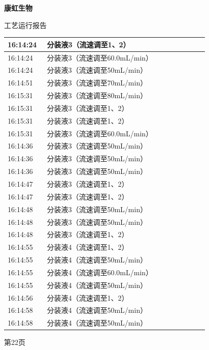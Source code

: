 \documentclass[UTF8,10pt,a4paper,fontset=fandol]{ctexart}
\begin{document}
\hfill
\begin{minipage}[t]{0.48\linewidth}
\centering
\textbf{康虹生物}

\vspace{0.2em}
工艺运行报告

\vspace{0.4em}
\scriptsize
\begin{tabular}{|p{0.18\linewidth}|p{0.74\linewidth}|}
\hline
16:14:24 & 分装液3（流速调至1、2）\\ \hline
16:14:24 & 分装液3（流速调至60.0mL/min）\\ \hline
16:14:24 & 分装液3（流速调至50mL/min）\\ \hline
16:14:51 & 分装液3（流速调至70mL/min）\\ \hline
16:15:31 & 分装液3（流速调至80mL/min）\\ \hline
16:15:31 & 分装液3（流速调至1、2）\\ \hline
16:15:31 & 分装液3（流速调至1、2）\\ \hline
16:15:31 & 分装液3（流速调至60.0mL/min）\\ \hline
16:14:36 & 分装液3（流速调至50mL/min）\\ \hline
16:14:36 & 分装液3（流速调至50mL/min）\\ \hline
16:14:36 & 分装液3（流速调至50mL/min）\\ \hline
16:14:47 & 分装液3（流速调至1、2）\\ \hline
16:14:47 & 分装液3（流速调至1、2）\\ \hline
16:14:48 & 分装液3（流速调至50mL/min）\\ \hline
16:14:48 & 分装液3（流速调至50mL/min）\\ \hline
16:14:48 & 分装液3（流速调至1、2）\\ \hline
16:14:55 & 分装液4（流速调至1、2）\\ \hline
16:14:55 & 分装液4（流速调至50mL/min）\\ \hline
16:14:55 & 分装液4（流速调至60.0mL/min）\\ \hline
16:14:55 & 分装液4（流速调至50mL/min）\\ \hline
16:14:56 & 分装液4（流速调至1、2）\\ \hline
16:14:58 & 分装液4（流速调至50mL/min）\\ \hline
16:14:58 & 分装液4（流速调至50mL/min）\\ \hline
\end{tabular}

\vspace{0.3em}
第22页
\end{minipage}
\end{document}
